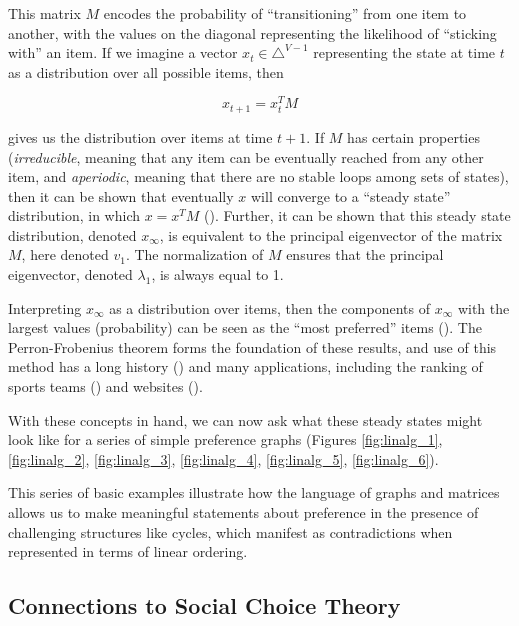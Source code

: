 This matrix $M$ encodes the probability of ``transitioning'' from one item to another, with the values on the diagonal representing the likelihood of ``sticking with'' an item. 
If we imagine a vector $x_t \in \triangle^{V-1}$ representing the state at time $t$ as a distribution over all possible items, then

\[
x_{t+1} = x_t^TM
\]

gives us the distribution over items at time $t+1$.
If $M$ has certain properties (\textit{irreducible}, meaning that any item can be eventually reached from any other item, and \textit{aperiodic}, meaning that there are no stable loops among sets of states), then it can be shown that eventually $x$ will converge to a ``steady state'' distribution, in which $x = x^TM$ (\cite{lin:2016}).
Further, it can be shown that this steady state distribution, denoted $x_{\infty}$, is equivalent to the principal eigenvector of the matrix $M$, here denoted $v_1$.
The normalization of $M$ ensures that the principal eigenvector, denoted $\lambda_1$, is always equal to 1.

Interpreting $x_{\infty}$ as a distribution over items, then the components of $x_{\infty}$ with the largest values (probability) can be seen as the ``most preferred'' items (\cite{paisley}).
The Perron-Frobenius theorem forms the foundation of these results, and use of this method has a long history (\cite{keener:1993}) and many applications, including the ranking of sports teams (\cite{landau:1915}) and websites (\cite{brin}).

\bigskip

With these concepts in hand, we can now ask what these steady states might look like for a series of simple preference graphs (Figures \ref{fig:linalg_1}, \ref{fig:linalg_2}, \ref{fig:linalg_3}, \ref{fig:linalg_4}, \ref{fig:linalg_5}, \ref{fig:linalg_6}).





This series of basic examples illustrate how the language of graphs and matrices allows us to make meaningful statements about preference in the presence of challenging structures like cycles, which manifest as contradictions when represented in terms of linear ordering.

\FloatBarrier

\subsection{Connections to Social Choice Theory}

